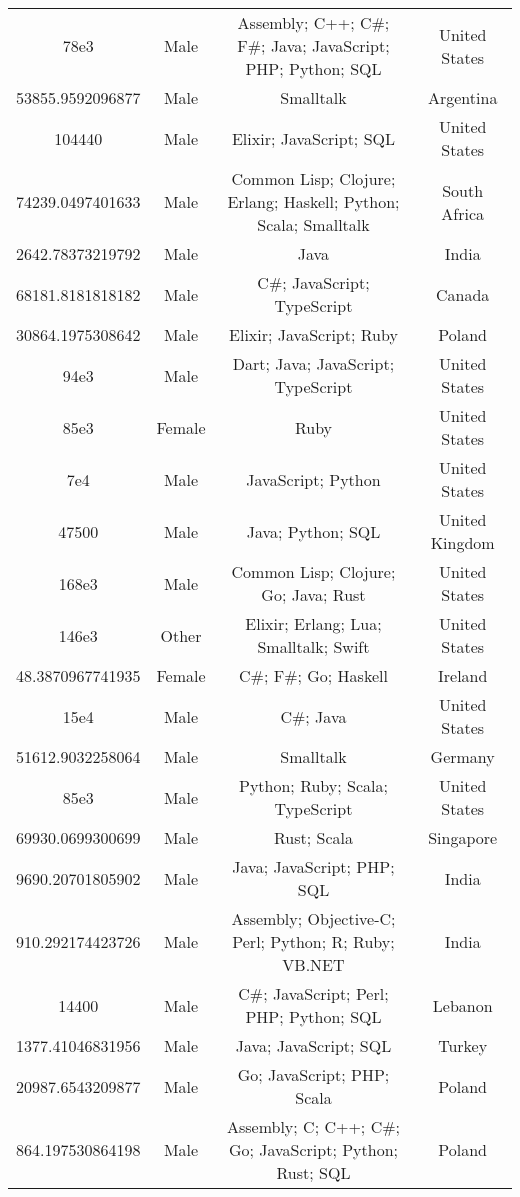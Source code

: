 \begin{center}
\begin{tabular}{ |c|c|c|c| }
78e3  &  Male  &  Assembly; C++; C\#; F\#; Java; JavaScript; PHP; Python; SQL  &  United States  \\ 
53855.9592096877  &  Male  &  Smalltalk  &  Argentina  \\ 
104440  &  Male  &  Elixir; JavaScript; SQL  &  United States  \\ 
74239.0497401633  &  Male  &  Common Lisp; Clojure; Erlang; Haskell; Python; Scala; Smalltalk  &  South Africa  \\ 
2642.78373219792  &  Male  &  Java  &  India  \\ 
68181.8181818182  &  Male  &  C\#; JavaScript; TypeScript  &  Canada  \\ 
30864.1975308642  &  Male  &  Elixir; JavaScript; Ruby  &  Poland  \\ 
94e3  &  Male  &  Dart; Java; JavaScript; TypeScript  &  United States  \\ 
85e3  &  Female  &  Ruby  &  United States  \\ 
7e4  &  Male  &  JavaScript; Python  &  United States  \\ 
47500  &  Male  &  Java; Python; SQL  &  United Kingdom  \\ 
168e3  &  Male  &  Common Lisp; Clojure; Go; Java; Rust  &  United States  \\ 
146e3  &  Other  &  Elixir; Erlang; Lua; Smalltalk; Swift  &  United States  \\ 
48.3870967741935  &  Female  &  C\#; F\#; Go; Haskell  &  Ireland  \\ 
15e4  &  Male  &  C\#; Java  &  United States  \\ 
51612.9032258064  &  Male  &  Smalltalk  &  Germany  \\ 
85e3  &  Male  &  Python; Ruby; Scala; TypeScript  &  United States  \\ 
69930.0699300699  &  Male  &  Rust; Scala  &  Singapore  \\ 
9690.20701805902  &  Male  &  Java; JavaScript; PHP; SQL  &  India  \\ 
910.292174423726  &  Male  &  Assembly; Objective-C; Perl; Python; R; Ruby; VB.NET  &  India  \\ 
14400  &  Male  &  C\#; JavaScript; Perl; PHP; Python; SQL  &  Lebanon  \\ 
1377.41046831956  &  Male  &  Java; JavaScript; SQL  &  Turkey  \\ 
20987.6543209877  &  Male  &  Go; JavaScript; PHP; Scala  &  Poland  \\ 
864.197530864198  &  Male  &  Assembly; C; C++; C\#; Go; JavaScript; Python; Rust; SQL  &  Poland  \\ 

\end{tabular}
\end{center}
